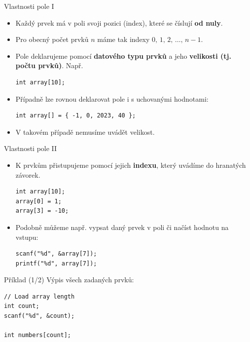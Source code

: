 \documentclass[14pt,aspectratio=169]{beamer}
\begin{document}
    \begin{frame}[t,fragile]{Vlastnosti pole I}
        \begin{itemize}
            \item Každý prvek má v poli svoji pozici (index), které se číslují \textbf{od nuly}.
            \item Pro obecný počet prvků $n$ máme tak indexy $0,\,1,\,2,\,\dots,\,n-1$.
            \item Pole deklarujeme pomocí \textbf{datového typu prvků} a jeho \textbf{velikosti (tj. počtu prvků)}. Např.
            \begin{lstlisting}
int array[10];
            \end{lstlisting}
            \item Případně lze rovnou deklarovat pole i s uchovanými hodnotami:
            \begin{lstlisting}
int array[] = { -1, 0, 2023, 40 };
            \end{lstlisting}
            \item V takovém případě nemusíme uvádět velikost.
        \end{itemize}
    \end{frame}

    \begin{frame}[t,fragile]{Vlastnosti pole II}
        \begin{itemize}
            \item K prvkům přistupujeme pomocí jejich \textbf{indexu}, který uvádíme do hranatých závorek.
            \begin{lstlisting}
int array[10];
array[0] = 1;
array[3] = -10;
            \end{lstlisting}
            \item Podobně můžeme např. vypsat daný prvek v poli či načíst hodnotu na vstupu:
            \begin{lstlisting}
scanf("%d", &array[7]);
printf("%d", array[7]);
            \end{lstlisting}
        \end{itemize}
    \end{frame}

    \begin{frame}[t,fragile]{Příklad (1/2)}
        Výpis všech zadaných prvků:
        \begin{lstlisting}
// Load array length
int count;
scanf("%d", &count);

int numbers[count];
        \end{lstlisting}
    \end{frame}
\end{document}
